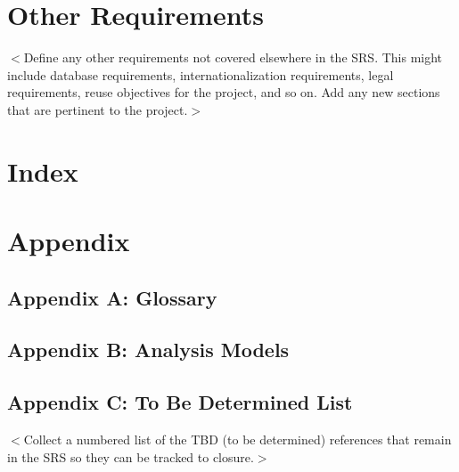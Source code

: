 \documentclass[draftclsnofoot,onecolumn,10pt]{IEEEtran}
\begin{document}
\section{Other Requirements}
$<$Define any other requirements not covered elsewhere in the SRS. This might 
include database requirements, internationalization requirements, legal 
requirements, reuse objectives for the project, and so on. Add any new sections 
that are pertinent to the project.$>$

\section{Index}

\section{Appendix}

\subsection{Appendix A: Glossary}

\subsection{Appendix B: Analysis Models}

\subsection{Appendix C: To Be Determined List}
$<$Collect a numbered list of the TBD (to be determined) references that remain 
in the SRS so they can be tracked to closure.$>$
\end{document}
